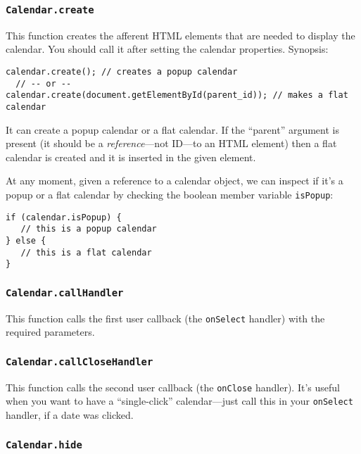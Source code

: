 \documentclass[a4paper,twoside,10pt]{dynadoc}
\begin{document}
\subsubsection{\texttt{Calendar.create}}\label{sec:Calendar.create}

This function creates the afferent HTML elements that are needed to display the
calendar.  You should call it after setting the calendar properties.  Synopsis:
\begin{verbatim}
calendar.create(); // creates a popup calendar
  // -- or --
calendar.create(document.getElementById(parent_id)); // makes a flat calendar
\end{verbatim}

It can create a popup calendar or a flat calendar.  If the ``parent'' argument
is present (it should be a \emph{reference}---not ID---to an HTML element) then
a flat calendar is created and it is inserted in the given element.

At any moment, given a reference to a calendar object, we can inspect if it's a
popup or a flat calendar by checking the boolean member variable
\texttt{isPopup}:

\begin{verbatim}
if (calendar.isPopup) {
   // this is a popup calendar
} else {
   // this is a flat calendar
}
\end{verbatim}

\subsubsection{\texttt{Calendar.callHandler}}\label{sec:Calendar.callHandler}

This function calls the first user callback (the
\texttt{onSelect} handler) with the required parameters.

\subsubsection{\texttt{Calendar.callCloseHandler}}\label{sec:Calendar.callCloseHandler}

This function calls the second user callback (the
\texttt{onClose} handler).  It's useful when you want to have a
``single-click'' calendar---just call this in your \texttt{onSelect} handler,
if a date was clicked.

\subsubsection{\texttt{Calendar.hide}}\label{sec:Calendar.hide}
\end{document}

